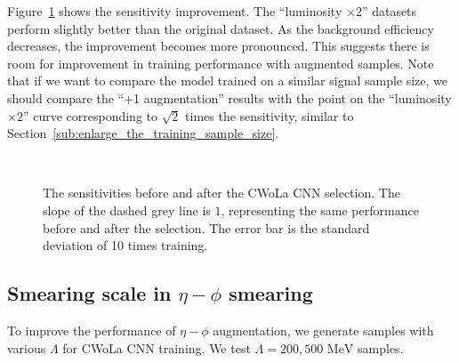 \documentclass[12pt]{article}
\begin{document}
        Figure~\ref{fig:sensitivity_improvement_origin_aug_1_x2_split_val} shows the sensitivity improvement. The ``luminosity $\times 2$'' datasets perform slightly better than the original dataset. As the background efficiency decreases, the improvement becomes more pronounced. This suggests there is room for improvement in training performance with augmented samples. Note that if we want to compare the model trained on a similar signal sample size, we should compare the ``+1 augmentation'' results with the point on the ``luminosity $\times 2$'' curve corresponding to $\sqrt{2}$ times the sensitivity, similar to Section~\ref{sub:enlarge_the_training_sample_size}.
        \begin{figure}[htpb]
            \centering
             \\
            \caption{The sensitivities before and after the CWoLa CNN selection. The slope of the dashed grey line is $1$, representing the same performance before and after the selection. The error bar is the standard deviation of 10 times training.}
            \label{fig:sensitivity_improvement_origin_aug_1_x2_split_val}
        \end{figure}
    \subsection{Smearing scale in \texorpdfstring{$\eta-\phi$}{eta-phi} smearing}%
    \label{sub:smearing_scale_in_eta_phi_smearing}
        To improve the performance of $\eta-\phi$ augmentation, we generate samples with various $\Lambda$ for CWoLa CNN training. We test $\Lambda = 200, 500 \text{ MeV}$ samples.
\end{document}
